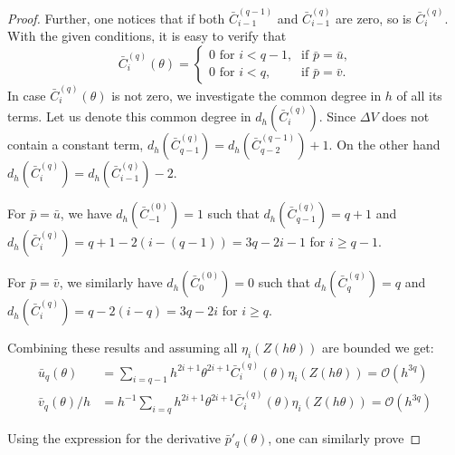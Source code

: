 \begin{proof}
    Further, one notices that if both $\bar{C}_{i-1}^{(q-1)}$ and $\bar{C}_{i-1}^{(q)}$ are zero, so is $\bar{C}_{i}^{(q)}$. With the given conditions,
    it is easy to verify that
    \[ \bar{C}_{i}^{(q)}(\theta)   =  \begin{cases}
            \text{$0$ for $i <q -1$,} & \text{if $\bar{p} = \bar{u}$,} \\
            \text{$0$ for $i <q$,}    & \text{if $\bar{p} = \bar{v}$.}
        \end{cases} \]
    In case $\bar{C}_{i}^{(q)}(\theta)$ is not zero, we investigate the common degree in $h$ of all its terms. Let us denote this common degree in $d_h(\bar{C}_{i}^{(q)})$.  Since $\Delta V$ does not contain a constant term, $d_h\left(\bar{C}_{q-1}^{(q)}\right) = d_h\left(\bar{C}_{q-2}^{(q-1)}\right)+1$.
    On the other hand $d_h\left(\bar{C}_{i}^{(q)}\right)=d_h\left(\bar{C}_{i-1}^{(q)}\right)-2$.

    For $\bar{p}=\bar{u}$, we have $d_h\left(\bar{C}_{-1}^{(0)}\right)=1$ such that $d_h\left(\bar{C}_{q-1}^{(q)}\right)=q+1$ and $d_h\left(\bar{C}_{i}^{(q)}\right) = q+1-2(i-(q-1))=3q-2i-1$ for $i \geq q-1$.

    For $\bar{p}=\bar{v}$, we similarly have $d_h\left(\bar{C}_{0}^{(0)}\right)=0$ such that $d_h\left(\bar{C}_{q}^{(q)}\right)=q$ and $d_h\left(\bar{C}_{i}^{(q)}\right) = q-2(i-q)=3q-2i$ for $i \geq q$.

    Combining these results and assuming all $\eta_i(Z(h\theta))$ are bounded we get:
    \begin{align*}
        \bar{u}_{q}(\theta)   & =  \sum_{i=q-1} h^{2i+1} \theta^{2i+1} \bar{C}^{(q)}_i(\theta) \eta_{i}(Z(h\theta)) = \mathcal{O}(h^{3q})     \\
        \bar{v}_{q}(\theta)/h & = h^{-1} \sum_{i=q} h^{2i+1} \theta^{2i+1} \bar{C}^{(q)}_i(\theta) \eta_{i}(Z(h\theta)) = \mathcal{O}(h^{3q})
    \end{align*}

    Using the expression for the derivative $\bar{p}'_{q}(\theta)$, one can similarly prove


\end{proof}
